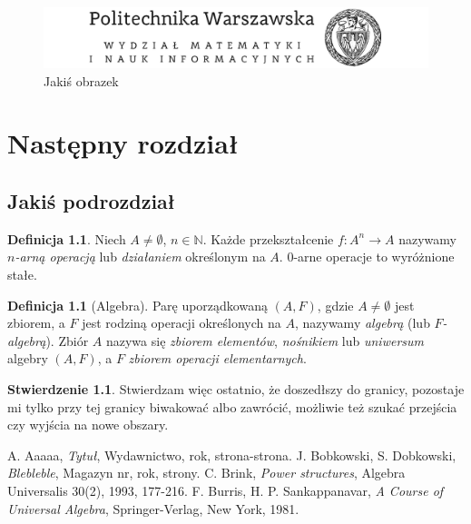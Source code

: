 \documentclass[a4paper,11pt,twoside]{report}
\theoremstyle{definition}
\newtheorem{proposition}[theorem]{Stwierdzenie}
\newtheorem{definition}[theorem]{Definicja}
\begin{document}
\begin{figure}[h!]
\centering
\includegraphics[scale=0.5]{politechnika}
\caption[Logo MiNI]{Jakiś obrazek}
\end{figure}


\chapter{Następny rozdział}



\section{Jakiś podrozdział}


\begin{definition}
Niech $A\neq \emptyset$, $n \in \mathbb{N}$. Każde przekształcenie $f:A^n \rightarrow A$ nazywamy \textit{$n$-arną operacją} lub \textit{działaniem} określonym na $A$.
0-arne operacje to wyróżnione stałe.
\end{definition}


\begin{definition}[Algebra]
Parę uporządkowaną $(A,F)$, gdzie $A\neq \emptyset$ jest zbiorem, a $F$ jest rodziną operacji określonych na $A$, nazywamy \textit{algebrą} (lub \textit{$F$-algebrą}). Zbiór $A$ nazywa się \textit{zbiorem elementów}, \textit{nośnikiem} lub \textit{uniwersum} algebry $(A,F)$, a $F$ \textit{zbiorem operacji elementarnych}.
\end{definition}

\begin{proposition}
Stwierdzam więc ostatnio, że doszedłszy do granicy, pozostaje mi tylko przy tej granicy biwakować albo zawrócić, możliwie też szukać przejścia czy wyjścia na nowe obszary.
\end{proposition}




\begin{thebibliography}{20}%

 A. Aaaaa, \emph{Tytuł}, Wydawnictwo, rok, strona-strona.
 J. Bobkowski, S. Dobkowski, \emph{Blebleble}, Magazyn nr, rok, strony.
 C. Brink, \emph{Power structures}, Algebra Universalis 30(2), 1993, 177-216.
 F. Burris, H. P. Sankappanavar, \emph{A Course of Universal Algebra}, Springer-Verlag, New York, 1981.
\end{thebibliography}
\thispagestyle{empty}
\end{document}
